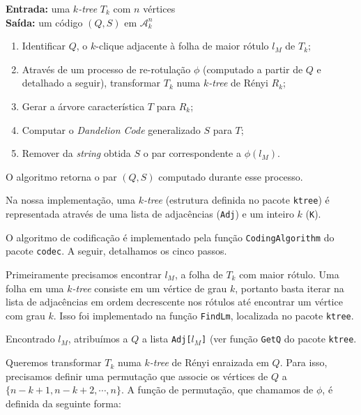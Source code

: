 \begin{algorithm}
  \textbf{Entrada:} uma \emph{$k$-tree} $T_k$ com $n$ vértices\\
  \textbf{Saída:} um código $(Q, S)$ em $\mathcal{A}^n_k$

  \begin{enumerate}
    \item Identificar $Q$, o $k$-clique adjacente à folha de maior rótulo $l_M$ de $T_k$;
    \item Através de um processo de re-rotulação $\phi$ (computado a partir de $Q$ e detalhado a seguir), transformar $T_k$ numa \emph{$k$-tree} de Rényi $R_k$;
    \item Gerar a árvore característica $T$ para $R_k$;
    \item Computar o \emph{Dandelion Code} generalizado $S$ para $T$;
    \item Remover da \emph{string} obtida $S$ o par correspondente a $\phi(l_M)$.
  \end{enumerate}

  O algoritmo retorna o par $(Q, S)$ computado durante esse processo.

  \vspace{2em}

  Na nossa implementação, uma \emph{$k$-tree} (estrutura definida no pacote {\tt ktree}) é representada através de uma lista de adjacências ({\tt Adj}) e um inteiro $k$ ({\tt K}).

  O algoritmo de codificação é implementado pela função {\tt CodingAlgorithm} do pacote {\tt codec}. A seguir, detalhamos os cinco passos.

  \begin{step}
    Primeiramente precisamos encontrar $l_M$, a folha de $T_k$ com maior rótulo. Uma folha em uma \emph{$k$-tree} consiste em um vértice de grau $k$, portanto basta iterar na lista de adjacências em ordem decrescente nos rótulos até encontrar um vértice com grau $k$. Isso foi implementado na função {\tt FindLm}, localizada no pacote {\tt ktree}.

    Encontrado $l_M$, atribuímos a $Q$ a lista {\tt Adj[$l_M$]} (ver função {\tt GetQ} do pacote {\tt ktree}.
  \end{step}

  \begin{step}
    Queremos transformar $T_k$ numa \emph{$k$-tree} de Rényi enraizada em $Q$. Para isso, precisamos definir uma permutação que associe os vértices de $Q$ a $\{n-k+1, n-k+2, \cdots, n\}$. A função de permutação, que chamamos de $\phi$, é definida da seguinte forma:


\end{step}
\end{algorithm}
